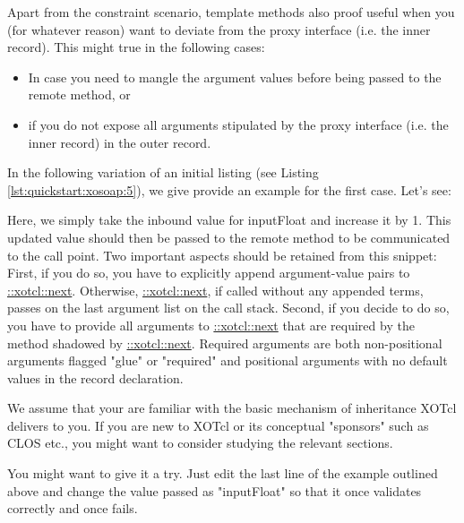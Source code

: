 %
Apart from the constraint scenario, template methods also proof useful
when you (for whatever reason) want to deviate from the proxy
interface (i.e. the inner record). This might true in the following
cases:
\begin{itemize}
\item In case you need to mangle the argument values before being
  passed to the remote method, or
\item if you do not expose all arguments stipulated by the proxy
  interface (i.e. the inner record) in the outer record.
\end{itemize}
%
In the following variation of an initial listing (see Listing
\ref{lst:quickstart:xosoap:5}), we give provide an example for the
first case. Let's see:
%
%

%
Here, we simply take the inbound value for inputFloat and increase it
by 1. This updated value should then be passed to the remote method to
be communicated to the call point. Two important aspects should be
retained from this snippet: First, if you do so, you have to
explicitly append argument-value pairs to
\href{http://media.wu-wien.ac.at/doc/tutorial.html#class_method_chaining}{::xotcl::next}. Otherwise,
\href{http://media.wu-wien.ac.at/doc/tutorial.html#class_method_chaining}{::xotcl::next},
if called without any appended terms, passes on the last argument list
on the call stack. Second, if you decide to do so, you have to provide
all arguments to
\href{http://media.wu-wien.ac.at/doc/tutorial.html#class_method_chaining}{::xotcl::next}
that are required by the method shadowed by
\href{http://media.wu-wien.ac.at/doc/tutorial.html#class_method_chaining}{::xotcl::next}. Required
arguments are both non-positional arguments flagged "glue" or
"required" and positional arguments with no default values in the
record declaration.
%
\begin{hints}
\item We assume that your are familiar with the basic mechanism of
  inheritance XOTcl delivers to you. If you are new to XOTcl or its
  conceptual "sponsors" such as CLOS etc., you might want to consider
  studying the relevant sections.
\item You might want to give it a try. Just edit the last line of the
  example outlined above and change the value passed as "inputFloat" so
  that it once validates correctly and once fails.
\end{hints}
